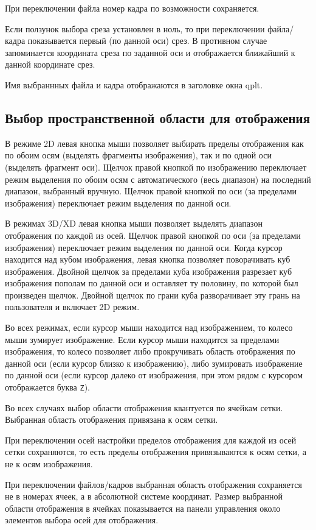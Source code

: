 \documentclass[12pt]{article}
\begin{document}
При переключении файла номер кадра по возможности сохраняется.

Если ползунок выбора среза установлен в ноль, то при переключении файла/кадра показывается первый (по данной оси) срез.
В противном случае запоминается координата среза по заданной оси и отображается ближайший к данной координате срез.

Имя выбраннных файла и кадра отображаются в заголовке окна qplt.

\subsection{Выбор пространственной области для отображения}
В режиме 2D левая кнопка мыши позволяет выбирать пределы отображения как по обоим осям (выделять фрагменты изображения),
так и по одной оси (выделять фрагмент оси). Щелчок правой кнопкой по изображению переключает режим выделения
по обоим осям с автоматического (весь диапазон) на последний диапазон, выбранный вручную. 
Щелчок правой кнопкой по оси (за пределами изображения) переключает режим выделения по данной оси.

В режимах 3D/XD левая кнопка мыши позволяет выделять диапазон отображения по каждой из осей. 
Щелчок правой кнопкой по оси (за пределами изображения) переключает режим выделения по данной оси.
Когда курсор  находится над кубом изображения, левая кнопка позволяет поворачивать куб изображения.
Двойной щелчок за пределами куба изображения разрезает куб изображения пополам по данной оси и оставляет ту половину,
по которой был произведен щелчок. Двойной щелчок по грани куба разворачивает эту грань на пользователя и включает 2D режим.

Во всех режимах, если курсор мыши находится над изображением, то колесо мыши зумирует изображение.
Если курсор мыши находится за пределами изображения, то колесо позволяет либо прокручивать область отображения по данной оси (если курсор
близко к изображению), либо зумировать изображение по данной оси (если курсор далеко от изображения, при этом рядом с курсором отображается буква \verb'Z').

Во всех случаях выбор области отображения квантуется по ячейкам сетки. 
Выбранная область отображения привязана к осям сетки.

При переключении осей настройки пределов отображения для каждой из осей сетки сохраняются, то есть пределы отображения привязываются к осям сетки, а не к осям изображения.

При переключении файлов/кадров выбранная область отображения сохраняется не в номерах ячеек, а в абсолютной системе координат.
Размер выбранной области отображения в ячейках показывается на панели управления около элементов выбора осей для отображения.
\end{document}
